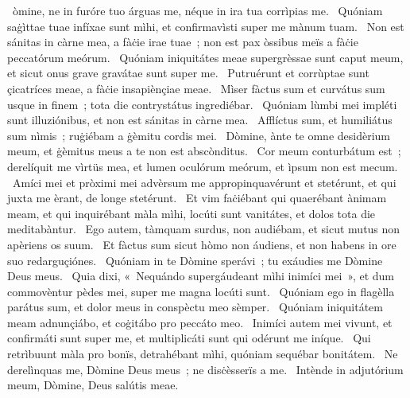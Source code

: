 { }
{%
~òmine, ne in furóre tuo árguas me, néque in ira tua corrìpias me. 
~Quóniam saġìttae tuae infíxae sunt mìhi, et confirmavìsti super me mànum tuam. 
~Non est sánitas in càrne mea, a fàċie irae tuae~; non est pax òssibus meïs a fàċie peccatórum meórum. 
~Quóniam iniquitátes meae supergrèssae sunt caput meum, et sicut onus grave gravátae sunt super me. 
~Putruérunt et corrùptae sunt çicatríces meae, a fàċie insapiènçiae meae. 
~Mìser fàctus sum et curvátus sum usque in finem~; tota die contrystátus ingrediébar. 
~Quóniam lùmbi mei impléti sunt illuziónibus, et non est sánitas in càrne mea. 
~Afflíctus sum, et humiliátus sum nìmis~; ruġiébam a ġèmitu cordis mei. 
~Dòmine, ànte te omne desidèrium meum, et ġèmitus meus a te non est abscònditus. 
~Cor meum conturbátum est~; derelíquit me vìrtüs mea, et lumen oculórum meórum, et ìpsum non est mecum. 
~Amíci mei et pròximi mei advèrsum me appropinquavérunt et stetérunt, et qui juxta me èrant, de longe stetérunt. 
~Et vim faċiébant qui quaerébant ànimam meam, et qui inquirébant màla mìhi, locúti sunt vanitátes, et dolos tota die meditabàntur. 
~Ego autem, tàmquam surdus, non audiébam, et sicut mutus non apèriens os suum. 
~Et fàctus sum sicut hòmo non áudiens, et non habens in ore suo redarguçiónes. 
~Quóniam in te Dòmine sperávi~; tu exáudies me Dòmine Deus meus. 
~Quia dixi, «~Nequándo supergáudeant mìhi inimíci mei~», et dum commovèntur pèdes mei, super me magna locúti sunt. 
~Quóniam ego in flagèlla parátus sum, et dolor meus in conspèctu meo sèmper. 
~Quóniam iniquitátem meam adnunçiábo, et coġitábo pro peccáto meo. 
~Inimíci autem mei vivunt, et confirmáti sunt super me, et multiplicáti sunt qui odérunt me iníque. 
~Qui retrìbuunt màla pro bonïs, detrahébant mìhi, quóniam sequébar bonitátem. 
~Ne derelìnquas me, Dòmine Deus meus~; ne disċèsserïs a me. 
~Intènde in adjutórium meum, Dòmine, Deus salútis meae. 
}

